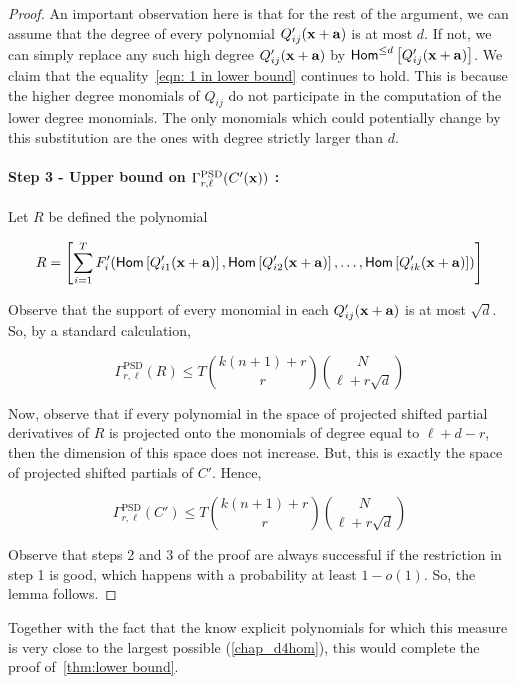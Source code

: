 \begin{proof}
An important observation here is that for the rest of the argument, we can assume that the degree of every polynomial $Q_{ij}'(\mathbf{x} + \mathbf{a})$ is at most $d$. If not, we can simply replace any such high degree $Q_{ij}'(\mathbf{x} + \mathbf{a})$ by 
$\mathsf{Hom}^{\leq d}\left[Q_{ij}'(\mathbf{x} + \mathbf{a})\right]$. We claim that the equality~\ref{eqn: 1 in lower bound} continues to hold. 
This is because the higher degree monomials of $Q_{ij}$ do not participate in the computation of the lower degree monomials. The only monomials which could potentially change by this substitution are the ones with degree strictly larger than  $d$. 
\paragraph{Step 3 - Upper bound on $\Gamma_{r,\ell}^{\text{PSD}}(C'(\mathbf{x}))$ :}
Let $R$ be defined the polynomial 

\[
R = \left[\sum_{i = 1}^T  F_{i}'(\mathsf{Hom}\left[ Q_{i1}'(\mathbf{x} + \mathbf{a})\right], \mathsf{Hom}\left[ Q_{i2}'(\mathbf{x} + \mathbf{a})\right], \ldots, \mathsf{Hom}\left[ Q_{ik}'(\mathbf{x} + \mathbf{a})\right])\right]
\]

Observe that the support of every monomial in each $Q_{ij}'(\mathbf{x}+\mathbf{a})$ is at most $\sqrt{d}$. So, by a standard calculation, 

$$\Gamma_{r, \ell}^{\text{PSD}}(R) \leq T{k(n+1) + r \choose r}{N \choose \ell + r\sqrt{d}}$$

Now, observe that if every polynomial in the space of projected shifted partial derivatives of $R$ is projected onto the monomials of degree equal to $\ell + d-r$, then the dimension of this space does not increase. But, this is exactly the space of projected shifted partials of $C'$. 
Hence,

\[
\Gamma_{r, \ell}^{\text{PSD}}(C') \leq T{k(n+1) + r \choose r}{N \choose \ell + r\sqrt{d}}
\]

Observe that steps 2 and 3 of the proof are always successful if the restriction in step 1 is good, which happens with a probability at least $1-o(1)$. So, the lemma follows. 
\end{proof}

Together with the fact that the know explicit polynomials for which this measure is very close to the largest possible (\autoref{chap_d4hom}), this would complete the proof of~\autoref{thm:lower bound}. 



